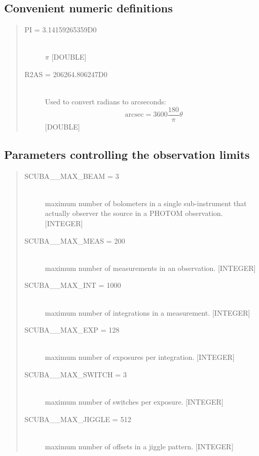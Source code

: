 \documentclass[twoside,11pt,nolof]{starlink}
\begin{document}
\subsection{Convenient numeric definitions}

\begin{quote}
\begin{description}
  \item[PI = 3.14159265359D0] \mbox{} \\
    $\pi$ [DOUBLE]
  \item[R2AS = 206264.806247D0] \mbox{} \\
    Used to convert radians to arcseconds:
    \begin{equation}
     \mathrm{arcsec} = 3600\frac{180}{\pi}\theta
    \end{equation}
  [DOUBLE]
\end{description}
\end{quote}

\subsection{Parameters controlling the observation limits}

\begin{quote}
\begin{description}
  \item[SCUBA\_\_MAX\_BEAM = 3] \mbox{} \\
     maximum number of bolometers in a single sub-instrument that actually
observer the source in a PHOTOM observation. [INTEGER]
  \item[SCUBA\_\_MAX\_MEAS = 200] \mbox{} \\
      maximum number of measurements in an observation. [INTEGER]
  \item[SCUBA\_\_MAX\_INT = 1000] \mbox{} \\
      maximum number of integrations in a measurement. [INTEGER]
  \item[SCUBA\_\_MAX\_EXP = 128] \mbox{} \\
      maximum number of exposures per integration. [INTEGER]
  \item[SCUBA\_\_MAX\_SWITCH = 3] \mbox{} \\
      maximum number of switches per exposure. [INTEGER]
  \item[SCUBA\_\_MAX\_JIGGLE = 512] \mbox{} \\
      maximum number of offsets in a jiggle pattern. [INTEGER]
\end{description}
\end{quote}
\end{document}
